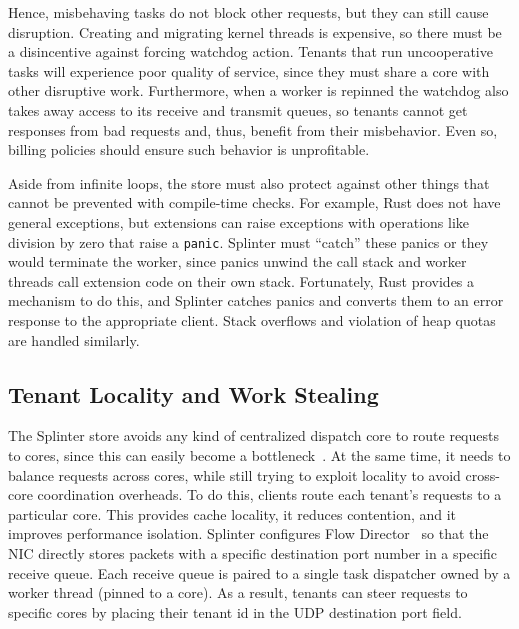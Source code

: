 Hence, misbehaving tasks do not block other requests, but they can still cause
  disruption.
Creating and migrating kernel threads is expensive,
  so there must be a disincentive against forcing watchdog action.
Tenants that run uncooperative tasks will experience poor quality of
  service, since they must share a core with other disruptive
  work.
Furthermore, when a worker is repinned the watchdog also takes away access to its
  receive and transmit queues, so tenants cannot get responses from bad
  requests and, thus, benefit from their misbehavior.
Even so, billing policies should ensure such behavior is unprofitable.

Aside from infinite loops, the store must also
  protect against other things that cannot be prevented with compile-time checks.
For example, Rust does not have general exceptions, but
  extensions can raise exceptions with operations like division by
  zero that raise a \texttt{panic}.
Splinter must ``catch'' these panics or they would terminate the worker,
  since panics unwind the call stack and worker threads call
  extension code on their own stack.
Fortunately, Rust provides a mechanism to do this, and Splinter catches
    panics and converts them to an error response to the appropriate client.
Stack overflows and violation of heap quotas are handled similarly.

\subsection{Tenant Locality and Work Stealing}
\label{sec:work-stealing}

The Splinter store avoids any kind of centralized dispatch core to route
  requests to cores, since this can easily become a bottleneck~\cite{ramcloud}.
At the same time, it needs to balance requests across cores, while still trying
  to exploit locality to avoid cross-core coordination overheads.
To do this, clients route each tenant's requests to a particular core.
This provides cache locality, it reduces contention, and it improves performance
  isolation.
Splinter configures Flow Director~\cite{flow-director} so that
  the NIC directly stores packets with a specific destination port
  number in a specific
  receive queue.
Each receive queue is paired to a single task dispatcher owned by a
worker thread (pinned to a core).
As a result, tenants can steer requests to specific cores by placing their
  tenant id in the UDP destination port field.

